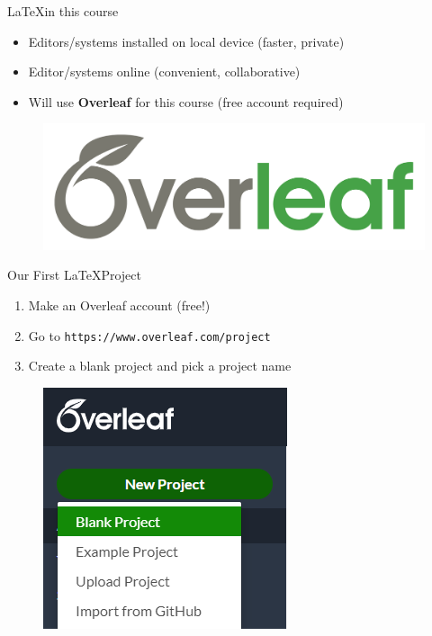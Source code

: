 \documentclass{beamer}
\begin{document}
{  \begin{frame}{\LaTeX\;in this course}
    \begin{itemize}
      \item Editors/systems installed on local device (faster, private)
      \pause
      \item Editor/systems online (convenient, collaborative)
      \pause
      \item Will use \textbf{Overleaf} for this course (free account required)
    \end{itemize}
    \begin{figure}
      \includegraphics[width=0.6\linewidth]{overleaf.png}
    \end{figure}
  \end{frame}

  \begin{frame}{Our First \LaTeX\;Project}
  \begin{enumerate}
    \item Make an Overleaf account (free!)
    \item Go to \texttt{https://www.overleaf.com/project}
    \item Create a blank project and pick a project name
  \end{enumerate}
    \begin{figure}
      \includegraphics[width=0.3\linewidth]{day01-overleaf-00.png}
    \end{figure}
  \end{frame}

}
\end{document}
